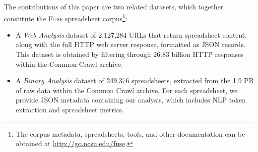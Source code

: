 \documentclass{svjour3}
\newcommand{\urlcount}{2,127,284}
\newcommand{\xlscount}{249,376}
\begin{document}


The contributions of this paper are two related datasets, which together constitute the \textsc{Fuse} spreadsheet corpus\footnote{The corpus metadata, spreadsheets, tools, and other documentation can be obtained at \url{http://go.ncsu.edu/fuse}.}:

\begin{itemize}
\item A \emph{Web Analysis} dataset of \urlcount{} URLs that return spreadsheet content, along with the full HTTP web server response, formatted as JSON records. This dataset is obtained by filtering through 26.83 billion HTTP responses within the Common Crawl archive.
\item A \emph{Binary Analysis} dataset of \xlscount{} spreadsheets, extracted from the 1.9 PB of raw data within the Common Crawl archive. For each spreadsheet, we provide JSON metadata containing our analysis, which includes NLP token extraction and spreadsheet metrics.
\end{itemize}





\end{document}
